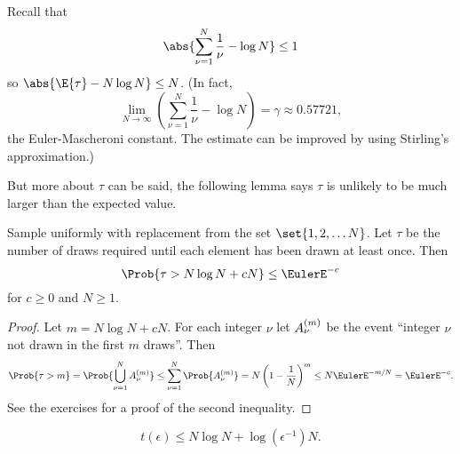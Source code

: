 \documentclass[12pt]{article}
\begin{document}
\begin{remark}
    Recall that
    \[
        \abs{ \sum\limits_{\nu=1}^N \frac{1}{\nu} - \log N } \le 1
    \] so \( \abs{\E{\tau} - N \log N} \le N \).  (In fact,
    \[
        \lim_{N \to \infty} \left( \sum\limits_{\nu=1}^N \frac{1}{\nu} -
        \log N \right) = \gamma \approx 0.57721,
    \] the Euler-Mascheroni constant. The estimate can be improved by
    using Stirling's approximation.)
\end{remark}

But more about \( \tau \) can be said, the following lemma says \( \tau \)
is unlikely to be much larger than the expected value.

\begin{lemma}
    Sample uniformly with replacement from the set \( \set{1, 2, \dots N}
    \).  Let \( \tau \) be the number of draws required until each
    element has been drawn at least once.  Then
    \[
        \Prob{\tau > N \log N + c N} \le \EulerE^{-c}
    \] for \( c \ge 0 \) and \( N \ge 1 \).
\end{lemma}

\begin{proof}
    Let \( m = N \log N + c N \).  For each integer \( \nu \) let \( A^{%
    (m)}_\nu \) be the event ``integer \( \nu \) not drawn in the first \(
    m \) draws''. Then
    \[
        \Prob{ \tau > m} = \Prob{ \bigcup_{\nu=1}^N A^{(m)}_\nu } \le
        \sum_{\nu=1}^N \Prob{A^{(m)}_\nu} = N \left( 1 - \frac{1}{N}
        \right)^m \le N \EulerE^{-m/N} = \EulerE^ {-c}.
    \] See the exercises for a proof of the second inequality.
\end{proof}

\begin{corollary}
    \[
        t(\epsilon) \le N \log N + \log(\epsilon^{-1}) N.
    \]
\end{corollary}
\end{document}
